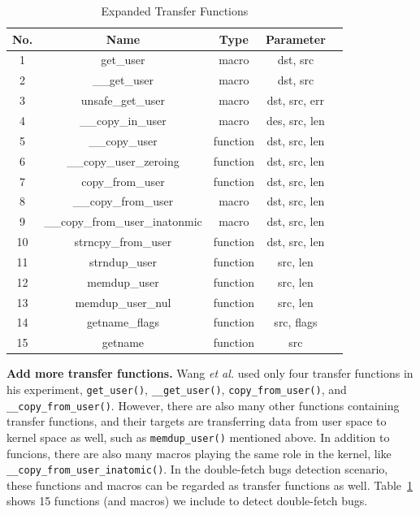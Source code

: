 \documentclass[10pt]{llncs}
\begin{document}
\begin{table}[t!]
\caption{Expanded Transfer Functions}
\centering
\begin{tabular}{ccccc} 
  \hline
  \textbf{No.} & \textbf{Name} & \textbf{Type} & \textbf{Parameter} \\
  \hline
  1 & get\_user & macro & dst, src \\
  2 & \_\_get\_user & macro & dst, src \\
  3 & unsafe\_get\_user & macro & dst, src, err \\
  4 & \_\_copy\_in\_user & macro & des, src, len \\
  5 & \_\_copy\_user & function & dst, src, len \\
  6 & \_\_copy\_user\_zeroing & function & dst, src, len \\
  7 & copy\_from\_user & function & dst, src, len \\
  8 & \_\_copy\_from\_user & macro & dst, src, len \\
  9 & \_\_copy\_from\_user\_inatonmic & macro & dst, src, len \\
  10 & strncpy\_from\_user & function & dst, src, len \\
  11 & strndup\_user & function & src, len \\
  12 & memdup\_user & function & src, len \\
  13 & memdup\_user\_nul & function & src, len \\
  14 & getname\_flags & function & src, flags \\
  15 & getname & function & src \\
  \hline
\end{tabular}
\label{transfer-func}
\end{table}


\textbf{Add more transfer functions.} Wang \textit{et al.} used only four transfer functions in his experiment, \verb:get_user():, \verb:__get_user():, \verb:copy_from_user():, and \verb:__copy_from_user():. However, there are also many other functions containing transfer functions, and their targets are transferring data from user space to kernel space as well, such as \verb:memdup_user(): mentioned above. In addition to funcions, there are also many macros playing the same role in the kernel, like \verb:__copy_from_user_inatomic():.
In the double-fetch bugs detection scenario, these functions and macros can be regarded as transfer functions as well. Table~\ref{transfer-func} shows 15 functions (and macros) we include to detect double-fetch bugs.%
\end{document}
